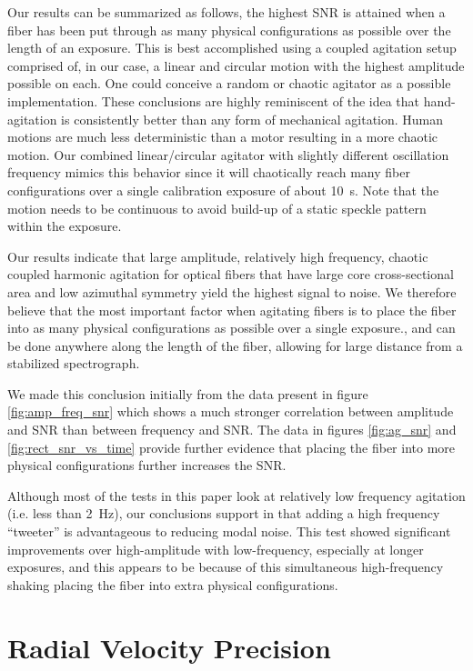 \documentclass[twocolumn]{emulateapj}
\begin{document}
Our results can be summarized as follows, the highest SNR is attained when a fiber has been put through as many physical configurations as possible over the length of an exposure. This is best accomplished using a coupled agitation setup comprised of, in our case, a linear and circular motion with the highest amplitude possible on each. One could conceive a random or chaotic agitator as a possible implementation. These conclusions are highly reminiscent of the idea that hand-agitation is consistently better than any form of mechanical agitation. Human motions are much less deterministic than a motor resulting in a more chaotic motion. Our combined linear/circular agitator with slightly different oscillation frequency mimics this behavior since it will chaotically reach many fiber configurations over a single calibration exposure of about \SI{10}{\second}. Note that the motion needs to be continuous to avoid build-up of a static speckle pattern within the exposure.

Our results indicate that large amplitude, relatively high frequency, chaotic coupled harmonic agitation for optical fibers that have large core cross-sectional area and low azimuthal symmetry yield the highest signal to noise. We therefore believe that the most important factor when agitating fibers is to place the fiber into as many physical configurations as possible over a single exposure., and can be done anywhere along the length of the fiber, allowing for large distance from a stabilized spectrograph.

We made this conclusion initially from the data present in figure \ref{fig:amp_freq_snr} which shows a much stronger correlation between amplitude and SNR than between frequency and SNR. The data in figures \ref{fig:ag_snr} and \ref{fig:rect_snr_vs_time} provide further evidence that placing the fiber into more physical configurations further increases the SNR.

Although most of the tests in this paper look at relatively low frequency agitation (i.e. less than \SI{2}{\hertz}), our conclusions support \cite{Plavchan2013} in that adding a high frequency ``tweeter'' is advantageous to reducing modal noise. This test showed significant improvements over high-amplitude with low-frequency, especially at longer exposures, and this appears to be because of this simultaneous high-frequency shaking placing the fiber into extra physical configurations.

\section{Radial Velocity Precision}
\label{sec:rv_precision}
\end{document}
